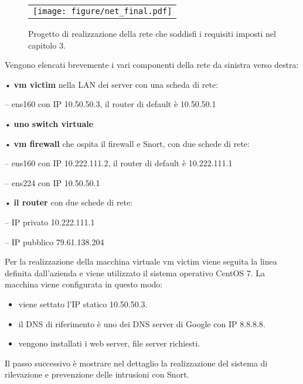 \begin{figure}[htb]
    \begin{center}
        \begin{tabular}{l}
            \texttt{[image: figure/net\_final.pdf]}
        \end{tabular}
    \end{center}
    \caption{Progetto di realizzazione della rete che soddisfi i requisiti imposti nel capitolo 3.}
\end{figure}

Vengono elencati brevemente i vari componenti della rete da sinistra verso destra:

• \textbf{vm victim} nella LAN dei server con una scheda di rete:

– ens160 con IP 10.50.50.3, il router di default è 10.50.50.1

• \textbf{uno switch virtuale}

• \textbf{vm firewall} che ospita il firewall e Snort, con due schede di rete:

– ens160 con IP 10.222.111.2, il router di default è 10.222.111.1

– ens224 con IP 10.50.50.1

• \textbf{il router} con due schede di rete:

– IP privato 10.222.111.1

– IP pubblico 79.61.138.204

Per la realizzazione della macchina virtuale vm victim viene seguita la linea definita dall'azienda e viene utilizzato il sistema operativo CentOS 7.
La macchina viene configurata in questo modo:
\begin{itemize}
    \item  viene settato l'IP statico 10.50.50.3.
    \item  il DNS di riferimento è uno dei DNS server di Google con IP 8.8.8.8.
    \item vengono installati i web server, file server richiesti.
\end{itemize}


Il passo successivo è mostrare nel dettaglio la realizzazione del sistema di rilevazione e prevenzione delle intrusioni con Snort.



